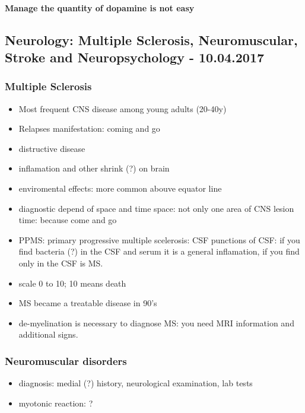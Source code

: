\documentclass[12pt,article,oneside,a4paper]{memoir}
\begin{document}
\paragraph{Manage the quantity of dopamine is not easy}

\subsection{Neurology: Multiple Sclerosis, Neuromuscular, Stroke and Neuropsychology - 10.04.2017}

\subsubsection{Multiple Sclerosis}
\begin{itemize}
\item Most frequent CNS disease among young adults (20-40y)
\item Relapses manifestation: coming and go
\item distructive disease
\item inflamation and other shrink (?) on brain
\item enviromental effects: more common abouve equator line
\item diagnostic depend of space and time
\subitem space: not only one area of CNS lesion
\subitem time: because come and go
\item PPMS: primary progressive multiple scelerosis: CSF
\subitem punctions of CSF: if you find bacteria (?) in the CSF and serum it is a general inflamation, if you find only in the CSF is MS.
\item scale 0 to 10; 10 means death
\item MS became a treatable disease in 90's
\item de-myelination is necessary to diagnose MS: you need MRI information and additional signs.
\end{itemize}

\subsubsection{Neuromuscular disorders}
\begin{itemize}
\item diagnosis: medial (?) history, neurological examination, lab tests
\item myotonic reaction: ?
\end{itemize}
\end{document}
